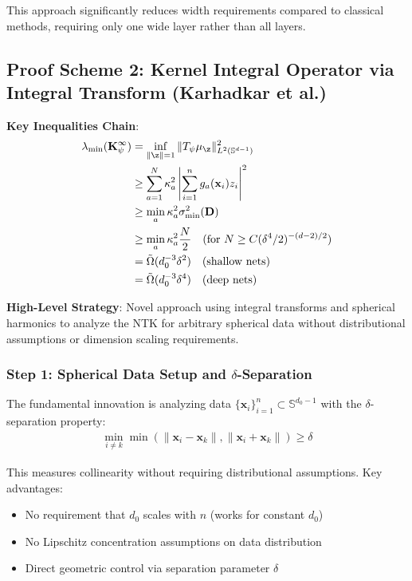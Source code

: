 \documentclass{article}
\newcommand{\x}{\mathbf{x}}
\begin{document}
This approach significantly reduces width requirements compared to classical methods, requiring only one wide layer rather than all layers.

\subsection{Proof Scheme 2: Kernel Integral Operator via Integral Transform (Karhadkar et al.)}

\textbf{Key Inequalities Chain}:
\begin{align}
    \lambda_{\min}(\mathbf{K}_{\psi}^{\infty}) &= \inf_{\|\z\|=1} \|T_{\psi}\mu_{\z}\|_{L^2(\mathbb{S}^{d-1})}^2 \\
    &\geq \sum_{a=1}^N \kappa_a^2 \left|\sum_{i=1}^n g_a(\x_i) z_i\right|^2 \\
    &\geq \min_a \kappa_a^2 \sigma_{\min}^2(\mathbf{D}) \\
    &\geq \min_a \kappa_a^2 \frac{N}{2} \quad \text{(for } N \geq C(\delta^4/2)^{-(d-2)/2}\text{)} \\
    &= \tilde{\Omega}(d_0^{-3}\delta^2) \quad \text{(shallow nets)} \\
    &= \tilde{\Omega}(d_0^{-3}\delta^4) \quad \text{(deep nets)}
\end{align}

\textbf{High-Level Strategy}: Novel approach using integral transforms and spherical harmonics to analyze the NTK for arbitrary spherical data without distributional assumptions or dimension scaling requirements.

\subsubsection{Step 1: Spherical Data Setup and $\delta$-Separation}

The fundamental innovation is analyzing data $\{\x_i\}_{i=1}^n \subset \mathbb{S}^{d_0-1}$ with the $\delta$-separation property:
\begin{align}
    \min_{i \neq k} \min(\|\x_i - \x_k\|, \|\x_i + \x_k\|) \geq \delta
\end{align}

This measures collinearity without requiring distributional assumptions. Key advantages:
\begin{itemize}
    \item No requirement that $d_0$ scales with $n$ (works for constant $d_0$)
    \item No Lipschitz concentration assumptions on data distribution
    \item Direct geometric control via separation parameter $\delta$
\end{itemize}
\end{document}
